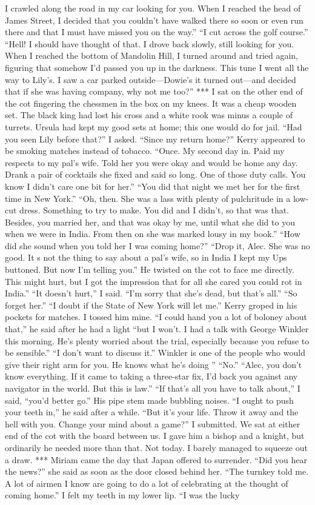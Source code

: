 \documentclass{novel}
\begin{document}
I crawled along the road in my car looking for you. When I reached the head of James Street, I decided that you couldn’t have walked there so soon or even run there and that I must have missed you on the way.” “I cut across the golf course.” “Hell! I should have thought of that. I drove back slowly, still looking for you. When I reached the bottom of Mandolin Hill, I turned around and tried again, figuring that somehow I’d passed you up in the darkness. This tune I went all the way to Lily’s. I saw a car parked outside—Dowie’s it turned out—and decided that if she was having company, why not me too?” *** I sat on the other end of the cot fingering the chessmen in the box on my knees. It was a cheap wooden set. The black king had lost his cross and a white rook was minus a couple of turrets. Ursula had kept my good sets at home; this one would do for jail. “Had you seen Lily before that?” I asked. “Since my return home?” Kerry appeared to be smoking matches instead of tobacco. “Once. My second day in. Paid my respects to my pal’s wife. Told her you were okay and would be home any day. Drank a pair of cocktails she fixed and said so long. One of those duty calls. You know I didn’t care one bit for her.” “You did that night we met her for the first time in New York.” “Oh, then. She was a lass with plenty of pulchritude in a low-cut dress. Something to try to make. You did and I didn’t, so that was that. Besides, you married her, and that was okay by me, until what she did to you when we were in India. From then on she was marked lousy in my book.” “How did she sound when you told her I was coming home?” “Drop it, Alec. She was no good. It s not the thing to say about a pal’s wife, so in India I kept my Ups buttoned. But now I’m telling you.” He twisted on the cot to face me directly. This might hurt, but I got the impression that for all she cared you could rot in India.” “It doesn’t hurt,” I said. “I’m sorry that she’s dead, but that’s all.” “So forget her.” “I doubt if the State of New York will let me.” Kerry groped in his pockets for matches. I tossed him mine. “I could hand you a lot of boloney about that,” he said after he had a light “but I won’t. I had a talk with George Winkler this morning. He’s plenty worried about the trial, especially because you refuse to be sensible.” “I don’t want to discuss it.” Winkler is one of the people who would give their right arm for you. He knows what he’s doing ” “No.” “Alec, you don’t know everything. If it came to taking a three-star fix, I’d back you against any navigator in the world. But this is law.” “If that’s all you have to talk about,” I said, “you’d better go.” His pipe stem made bubbling noises. “I ought to push your teeth in,” he said after a while. “But it’s your life. Throw it away and the hell with you. Change your mind about a game?” I submitted. We sat at either end of the cot with the board between us. I gave him a bishop and a knight, but ordinarily he needed more than that. Not today. I barely managed to squeeze out a draw. *** Miriam came the day that Japan offered to surrender. “Did you hear the news?” she said as soon as the door closed behind her. “The turnkey told me. A lot of airmen I know are going to do a lot of celebrating at the thought of coming home.” I felt my teeth in my lower lip. “I was the lucky 
\end{document}

